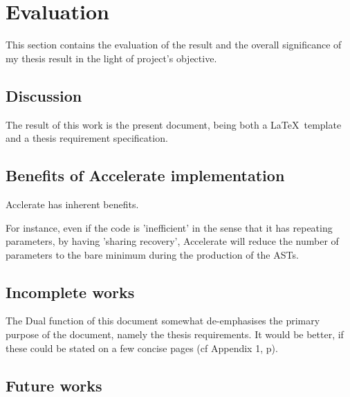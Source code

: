 \chapter{Evaluation}\label{ch:eval}

This section contains the evaluation of the result and the overall significance of my thesis result in the light of project's objective.

\section{Discussion} \label{se:eval.discuss}

The result of this work is the present document, being both a \LaTeX\
template and a thesis requirement specification.

\section{Benefits of Accelerate implementation} \label{se:impl.benefits}

Acclerate has inherent benefits.

For instance, even if the code is 'inefficient' in the sense that it has repeating parameters, by having 'sharing recovery', Accelerate will reduce the number of parameters to the bare minimum during the production of the ASTs.

\section{Incomplete works} \label{se:eval.incomplete}

The Dual function of this document somewhat de-emphasises the primary
purpose of the document, namely the thesis requirements.  It would be
better, if these could be stated on a few concise pages (cf Appendix
1, p\pageref{app1}).

\section{Future works} \label{se:eval.future}
